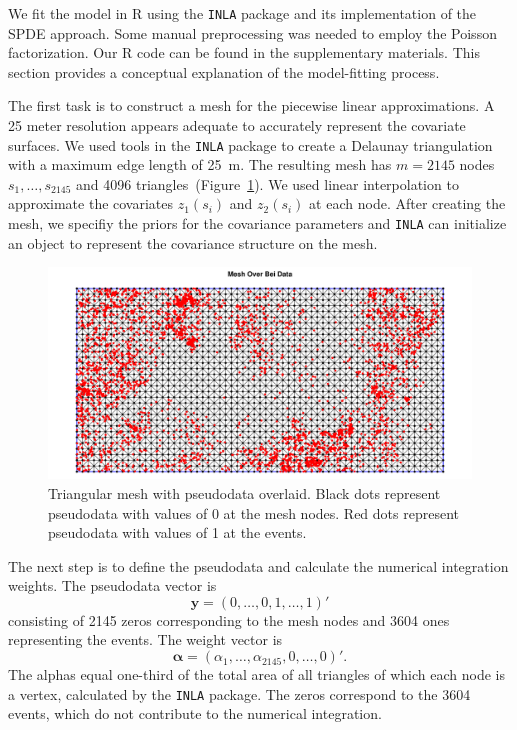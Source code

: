 \documentclass[]{interact}
\begin{document}
We fit the model in R using the \texttt{INLA} package and its implementation of
the SPDE approach. Some manual preprocessing was needed to employ the Poisson
factorization. Our R code can be found in the supplementary materials. This
section provides a conceptual explanation of the model-fitting process.

The first task is to construct a mesh for the piecewise linear approximations.
A 25 meter resolution appears adequate to accurately represent the covariate
surfaces. We used tools in the \texttt{INLA} package to create a Delaunay
triangulation with a maximum edge length of 25~m. The resulting mesh has
\(m = 2145\) nodes \(s_{1},  \dots, s_{2145}\) and 4096
triangles~(Figure~\ref{beimesh}). We used linear interpolation to approximate
the covariates \(z_{1}(s_{i})\) and \(z_{2}(s_{i})\) at each node. After
creating the mesh, we specifiy the priors for the covariance parameters and
\texttt{INLA} can initialize an object to represent the covariance structure
on the mesh.

\begin{figure}[t]
\includegraphics[width=\textwidth]{figures/bei_mesh.pdf}
\caption{Triangular mesh with pseudodata overlaid. Black dots represent
pseudodata with values of 0 at the mesh nodes. Red dots represent pseudodata
with values of 1 at the events.}
\label{beimesh}
\end{figure}

The next step is to define the pseudodata and calculate the numerical
integration weights. The pseudodata vector is
\begin{displaymath}
\mathbf{y} = (0, \dots, 0, 1, \dots, 1)'
\end{displaymath}
consisting of 2145 zeros corresponding to the mesh nodes and 3604 ones
representing the events. The weight vector is
\begin{displaymath}
\boldsymbol{\alpha} = (\alpha_{1}, \dots, \alpha_{2145}, 0, \dots, 0)'.
\end{displaymath}
The alphas equal one-third of the total area of all triangles of which each
node is a vertex, calculated by the \texttt{INLA} package. The zeros
correspond to the 3604 events, which do not contribute to the numerical
integration.
\end{document}

